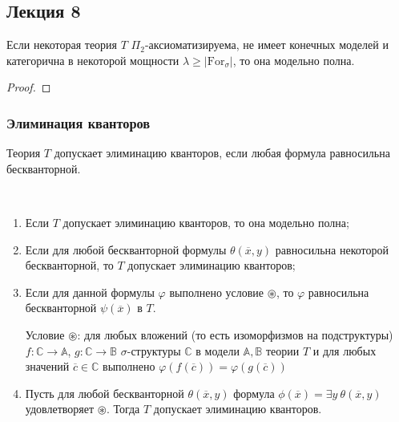 \subsection{Лекция 8}

\begin{stat}
    Если некоторая теория $T$ $\Pi_2$-аксиоматизируема, не имеет конечных моделей и категорична в некоторой мощности $\lambda\ge|\text{For}_\sigma|$, то она модельно полна.
\end{stat}

\begin{proof}
\end{proof}




\subsubsection{Элиминация кванторов}
\begin{definition}
    Теория $T$ допускает элиминацию кванторов, если любая формула равносильна бескванторной.
\end{definition}

\begin{prop}\
    \begin{enumerate}
        \item Если $T$ допускает элиминацию кванторов, то она модельно полна;

        \item Если для любой бескванторной формулы $\theta(\overline{x}, y)$ равносильна некоторой бескванторной, то $T$ допускает элиминацию кванторов;

        \item Если для данной формулы $\varphi$ выполнено условие $\circledast$, то $\varphi$ равносильна бескванторной $\psi(\overline{x})$ в $T$.

            Условие $\circledast$: для любых вложений (то есть изоморфизмов на подструктуры) $f: \mathbb{C} \rightarrow \mathbb{A}$, $g: \mathbb{C} \rightarrow \mathbb{B}$ $\sigma$-структуры $\mathbb{C}$ в модели $\mathbb{A}, \mathbb{B}$ теории $T$ и для любых значений $\overline{c}\in\mathbb{C}$  выполнено $\varphi(f(\overline{c}))=\varphi(g(\overline{c}))$  

        \item Пусть для любой бескванторной $\theta(\overline{x}, y)$ формула $\phi(\overline{x}) = \exists y~\theta(\overline{x}, y)$ удовлетворяет $\circledast$. Тогда $T$ допускает элиминацию кванторов.
    \end{enumerate}
\end{prop}


